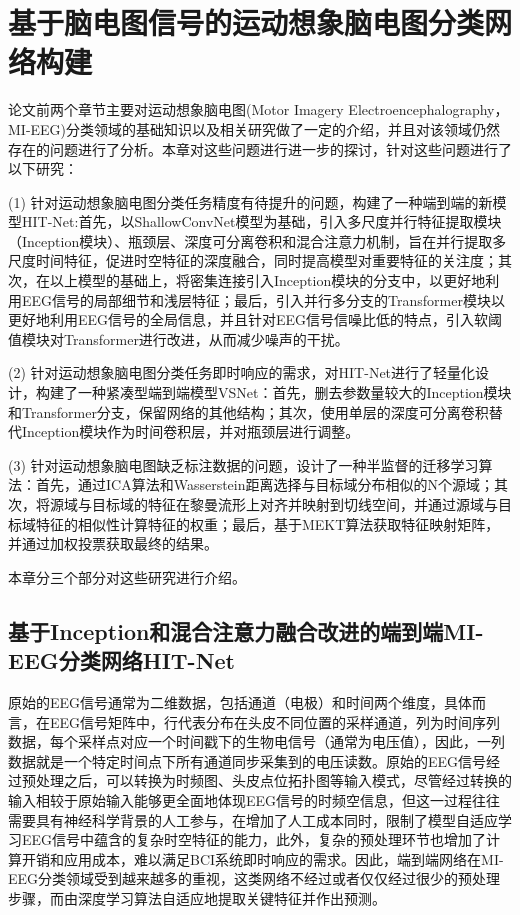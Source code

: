 
\chapter{基于脑电图信号的运动想象脑电图分类网络构建}

论文前两个章节主要对运动想象脑电图(Motor Imagery Electroencephalography，MI-EEG)分类领域的基础知识以及相关研究做了一定的介绍，并且对该领域仍然存在的问题进行了分析。本章对这些问题进行进一步的探讨，针对这些问题进行了以下研究：

(1) 针对运动想象脑电图分类任务精度有待提升的问题，构建了一种端到端的新模型HIT-Net:首先，以ShallowConvNet模型为基础，引入多尺度并行特征提取模块（Inception模块）\cite{szegedy2015going}、瓶颈层、深度可分离卷积和混合注意力机制，旨在并行提取多尺度时间特征，促进时空特征的深度融合，同时提高模型对重要特征的关注度；其次，在以上模型的基础上，将密集连接引入Inception模块的分支中，以更好地利用EEG信号的局部细节和浅层特征；最后，引入并行多分支的Transformer模块以更好地利用EEG信号的全局信息，并且针对EEG信号信噪比低的特点，引入软阈值模块对Transformer进行改进，从而减少噪声的干扰。

(2) 针对运动想象脑电图分类任务即时响应的需求，对HIT-Net进行了轻量化设计，构建了一种紧凑型端到端模型VSNet：首先，删去参数量较大的Inception模块和Transformer分支，保留网络的其他结构；其次，使用单层的深度可分离卷积替代Inception模块作为时间卷积层，并对瓶颈层进行调整。

(3) 针对运动想象脑电图缺乏标注数据的问题，设计了一种半监督的迁移学习算法：首先，通过ICA算法和Wasserstein距离\cite{rubner2000earth}选择与目标域分布相似的N个源域；其次，将源域与目标域的特征在黎曼流形上对齐并映射到切线空间，并通过源域与目标域特征的相似性计算特征的权重；最后，基于MEKT算法获取特征映射矩阵，并通过加权投票获取最终的结果。

本章分三个部分对这些研究进行介绍。

\section{基于Inception和混合注意力融合改进的端到端MI-EEG分类网络HIT-Net}

原始的EEG信号通常为二维数据，包括通道（电极）和时间两个维度，具体而言，在EEG信号矩阵中，行代表分布在头皮不同位置的采样通道，列为时间序列数据，每个采样点对应一个时间戳下的生物电信号（通常为电压值），因此，一列数据就是一个特定时间点下所有通道同步采集到的电压读数。原始的EEG信号经过预处理之后，可以转换为时频图、头皮点位拓扑图等输入模式，尽管经过转换的输入相较于原始输入能够更全面地体现EEG信号的时频空信息，但这一过程往往需要具有神经科学背景的人工参与，在增加了人工成本同时，限制了模型自适应学习EEG信号中蕴含的复杂时空特征的能力，此外，复杂的预处理环节也增加了计算开销和应用成本，难以满足BCI系统即时响应的需求。因此，端到端网络在MI-EEG分类领域受到越来越多的重视，这类网络不经过或者仅仅经过很少的预处理步骤，而由深度学习算法自适应地提取关键特征并作出预测。


